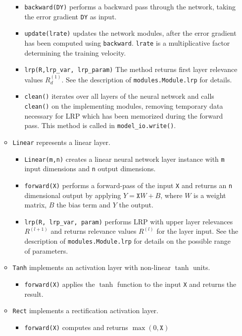 \documentclass[a4wide]{article}
\begin{document}
\begin{itemize}
\begin{itemize}
\begin{itemize}
				 \item \texttt{backward(DY)} performs a backward pass through the network, taking the error gradient \texttt{DY} as input.
				 \item \texttt{update(lrate)} updates the network modules, after the error gradient has been computed using \texttt{backward}. \texttt{lrate} is a multiplicative factor determining the training velocity.
				\item \texttt{lrp(R,lrp\_var, lrp\_param)}
				The method returns first layer relevance values $R_d^{(1)}$. See the description of  \texttt{modules.Module.lrp} for details.


				\item \texttt{clean()} iterates over all layers of the neural network and calls \texttt{clean()} on the implementing modules, removing temporary data necessary for LRP	which has been memorized during the forward pass. This method is called in \texttt{model\_io.write()}.
			\end{itemize}

		\item \texttt{Linear} represents a linear layer.
			\begin{itemize}
				\item \texttt{Linear(m,n)} creates a linear neural network layer instance with \texttt{m} input dimensions and \texttt{n} output dimensions.

				\item \texttt{forward(X)} performs a forward-pass of the input \texttt{X} and returns an \texttt{n} dimensional output by applying $Y  = \texttt{X}W + B$, where $W$ is a weight matrix, $B$ the bias term and $Y$ the output.

				\item \texttt{lrp(R, lrp\_var, param)} performs LRP with upper layer relevances $R^{(l+1)}$ and returns relevance values $R^{(l)}$ for the layer input. See the description of \texttt{modules.Module.lrp} for details on the possible range of parameters.

			\end{itemize}
		\item \texttt{Tanh} implements an activation layer with non-linear $\tanh$ units.
			\begin{itemize}
				\item \texttt{forward(X)} applies the $\tanh$ function to the input \texttt{X} and returns the result.
			\end{itemize}

		\item \texttt{Rect} implements a rectification activation layer.
			\begin{itemize}
				\item \texttt{forward(X)} computes and returns $\max(0,\texttt{X})$
			\end{itemize}


\end{itemize}
\end{itemize}
\end{document}
